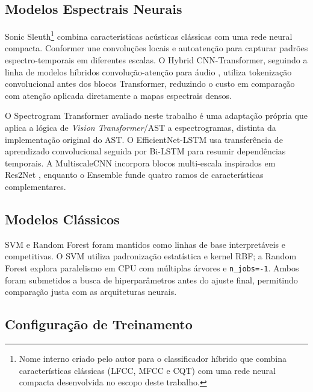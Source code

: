 \documentclass[12pt,a4paper]{article}
\begin{document}
\subsection{Modelos Espectrais Neurais}

Sonic Sleuth\footnote{Nome interno criado pelo autor para o classificador híbrido
que combina características clássicas (LFCC, MFCC e CQT) com uma rede neural
compacta desenvolvida no escopo deste trabalho.} combina características
acústicas clássicas com uma rede neural compacta. Conformer
\cite{gulati2020conformer} une convoluções locais e autoatenção para capturar
padrões espectro-temporais em diferentes escalas. O Hybrid CNN-Transformer,
seguindo a linha de modelos híbridos convolução-atenção para áudio
\cite{pham2024deepfake}, utiliza tokenização convolucional antes dos blocos
Transformer, reduzindo o custo em comparação com atenção aplicada diretamente
a mapas espectrais densos.

O Spectrogram Transformer avaliado neste trabalho é uma adaptação própria que
aplica a lógica de \textit{Vision Transformer}/AST \cite{gong2021ast} a
espectrogramas, distinta da implementação original do AST. O EfficientNet-LSTM usa transferência de
aprendizado convolucional seguida por Bi-LSTM para resumir dependências
temporais. A MultiscaleCNN incorpora blocos multi-escala inspirados em
Res2Net \cite{gao2021res2net}, enquanto o Ensemble funde quatro ramos de
características complementares.

\subsection{Modelos Clássicos}

SVM e Random Forest foram mantidos como linhas de base interpretáveis e
competitivas. O
SVM utiliza padronização estatística e kernel RBF; a Random Forest explora
paralelismo em CPU com múltiplas árvores e \texttt{n\_jobs=-1}. Ambos foram
submetidos a busca de hiperparâmetros antes do ajuste final, permitindo
comparação justa com as arquiteturas neurais.

\subsection{Configuração de Treinamento}
\end{document}
